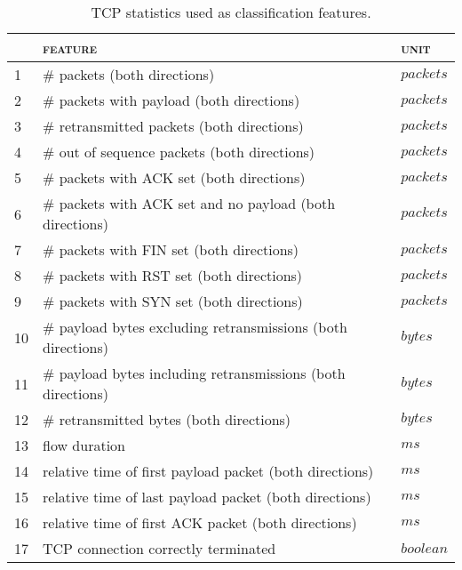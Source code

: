 \documentclass[times,review]{article}
\begin{document}
\begin{table}[H]
    \centering
    \begin{tabular}{lll}
        \toprule
        & \textsc{feature} & \textsc{unit}\\
        \midrule
        1 &\# packets (both directions) & $packets$\\
        2 &\# packets with payload (both directions) & $packets$\\
        3 &\# retransmitted packets (both directions) & $packets$\\
        4 &\# out of sequence packets (both directions) & $packets$\\
        5 &\# packets with ACK set (both directions) & $packets$\\
        6 &\# packets with ACK set and no payload (both directions) & $packets$\\
        7 &\# packets with FIN set (both directions) & $packets$\\
        8 &\# packets with RST set (both directions)\footnotemark & $packets$\\
        9 &\# packets with SYN set (both directions) & $packets$\\

        10 &\# payload bytes excluding retransmissions (both directions) & $bytes$\\
        11 &\# payload bytes including retransmissions (both directions) & $bytes$\\
        12 & \# retransmitted bytes (both directions) & $bytes$\\

        13& flow duration & $ms$\\
        14 &relative time of first payload packet (both directions) & $ms$\\
        15 &relative time of last payload packet (both directions) & $ms$\\
        16 &relative time of first ACK packet (both directions) & $ms$\\

        17 &TCP connection correctly terminated & $boolean$\\
        \bottomrule
    \end{tabular}
    \caption{TCP statistics used as classification features.}
    \label{tab:features}
\end{table}

\end{document}
